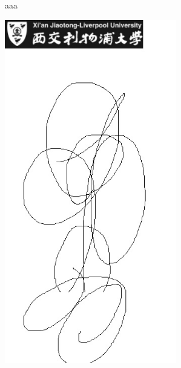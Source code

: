 \documentclass{article}
\begin{document}
aaa

\vspace{14cm}

\includegraphics[height=15cm]{examplelogo}
\end{document}
